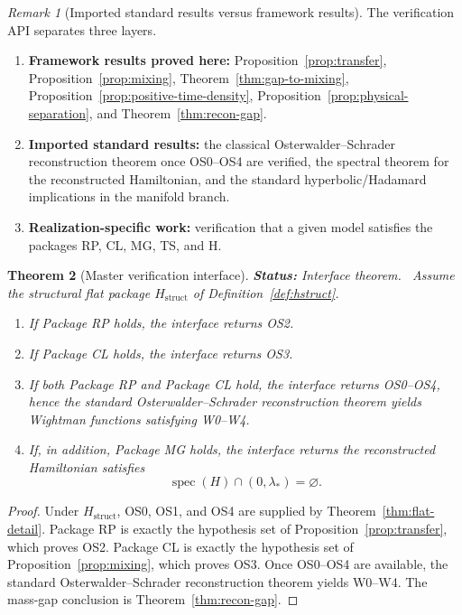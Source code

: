 \documentclass[12pt,a4paper]{article}
\theoremstyle{plain}
\newtheorem{theorem}{Theorem}[section]
\theoremstyle{definition}
\theoremstyle{remark}
\newtheorem{remark}[theorem]{Remark}
\newcommand{\spec}{\operatorname{spec}}
\newcommand{\status}[1]{\textnormal{\textbf{Status:} #1.}\ }
\begin{document}
\begin{remark}[Imported standard results versus framework results]
  The verification API separates three layers.
  \begin{enumerate}[nosep,label=(\roman*)]
  \item \textbf{Framework results proved here:}
    Proposition~\ref{prop:transfer},
    Proposition~\ref{prop:mixing},
    Theorem~\ref{thm:gap-to-mixing},
    Proposition~\ref{prop:positive-time-density},
    Proposition~\ref{prop:physical-separation}, and
    Theorem~\ref{thm:recon-gap}.
  \item \textbf{Imported standard results:} the classical
    Osterwalder--Schrader reconstruction theorem once OS0--OS4 are
    verified, the spectral theorem for the reconstructed Hamiltonian,
    and the standard hyperbolic/Hadamard implications in the manifold
    branch.
  \item \textbf{Realization-specific work:} verification that a given
    model satisfies the packages RP, CL, MG, TS, and H.
  \end{enumerate}
\end{remark}

\begin{theorem}[Master verification interface]\label{thm:verification-interface}
  \status{Interface theorem}
  Assume the structural flat package $H_{\mathrm{struct}}$ of
  Definition~\ref{def:hstruct}.
  \begin{enumerate}[nosep,label=(\alph*)]
  \item If Package RP holds, the interface returns OS2.
  \item If Package CL holds, the interface returns OS3.
  \item If both Package RP and Package CL hold, the interface returns
    OS0--OS4, hence the standard Osterwalder--Schrader reconstruction
    theorem yields Wightman functions satisfying W0--W4.
  \item If, in addition, Package MG holds, the interface returns the reconstructed
    Hamiltonian satisfies
    \[
      \spec(H)\cap (0,\lambda_*) = \varnothing.
    \]
  \end{enumerate}
\end{theorem}
\begin{proof}
  Under $H_{\mathrm{struct}}$, OS0, OS1, and OS4 are supplied by
  Theorem~\ref{thm:flat-detail}. Package RP is exactly the hypothesis
  set of Proposition~\ref{prop:transfer}, which proves OS2. Package CL
  is exactly the hypothesis set of Proposition~\ref{prop:mixing},
  which proves OS3. Once OS0--OS4 are available, the standard
  Osterwalder--Schrader reconstruction theorem yields W0--W4. The
  mass-gap conclusion is Theorem~\ref{thm:recon-gap}.
\end{proof}
\end{document}
